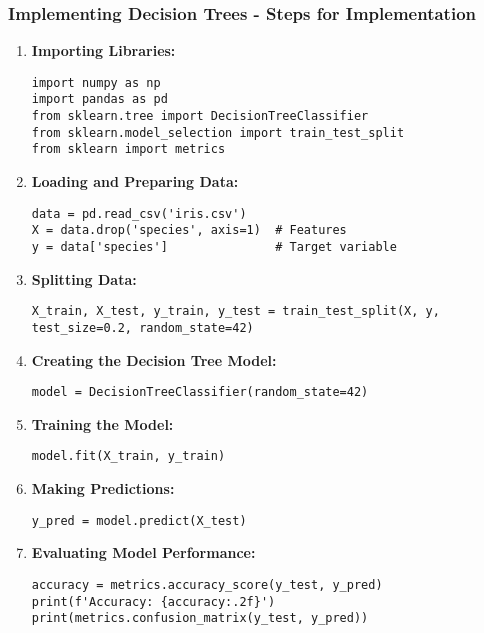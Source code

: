 \documentclass[aspectratio=169]{beamer}
\begin{document}
\begin{frame}[fragile]
    \frametitle{Implementing Decision Trees - Steps for Implementation}
    \begin{enumerate}
        \item \textbf{Importing Libraries:}
        \begin{lstlisting}
import numpy as np
import pandas as pd
from sklearn.tree import DecisionTreeClassifier
from sklearn.model_selection import train_test_split
from sklearn import metrics
        \end{lstlisting}

        \item \textbf{Loading and Preparing Data:}
        \begin{lstlisting}
data = pd.read_csv('iris.csv')
X = data.drop('species', axis=1)  # Features
y = data['species']               # Target variable
        \end{lstlisting}

        \item \textbf{Splitting Data:}
        \begin{lstlisting}
X_train, X_test, y_train, y_test = train_test_split(X, y, test_size=0.2, random_state=42)
        \end{lstlisting}

        \item \textbf{Creating the Decision Tree Model:}
        \begin{lstlisting}
model = DecisionTreeClassifier(random_state=42)
        \end{lstlisting}

        \item \textbf{Training the Model:}
        \begin{lstlisting}
model.fit(X_train, y_train)
        \end{lstlisting}

        \item \textbf{Making Predictions:}
        \begin{lstlisting}
y_pred = model.predict(X_test)
        \end{lstlisting}

        \item \textbf{Evaluating Model Performance:}
        \begin{lstlisting}
accuracy = metrics.accuracy_score(y_test, y_pred)
print(f'Accuracy: {accuracy:.2f}')
print(metrics.confusion_matrix(y_test, y_pred))
        \end{lstlisting}
    \end{enumerate}
\end{frame}
\end{document}
